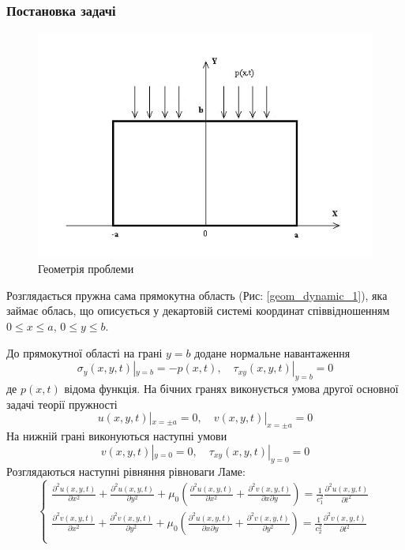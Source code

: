 \subsubsection{Постановка задачі}
\begin{figure}[h]
    \begin{center}
        \includegraphics[scale=1]{images/geometry/image_2.jpg}
    \end{center}
    \caption{Геометрія проблеми}\label{geom_dynamic_2}
\end{figure}
Розглядається пружна сама прямокутна область (Рис: \ref{geom_dynamic_1}), яка займає облась,
що описується у декартовій системі координат співвідношенням $0 \le x \le a$, $0 \le y \le b$.

До прямокутної області на грані $y=b$ додане нормальне навантаження
\begin{equation}
    \sigma_y(x, y, t) |_{y=b} = -p(x, t), \quad  \tau_{xy}(x,y,t) |_{y=b} =0
\end{equation}
де $p(x,t)$ відома функція.
На бічних гранях виконується умова другої основної задачі теорії пружності
\begin{equation}
    u(x,y,t) |_{x=\pm a} = 0, \quad v(x,y,t) |_{x=\pm a} =0
\end{equation}
На нижній грані виконуються наступні умови
\begin{equation}
    v(x,y,t) |_{y=0} = 0, \quad \tau_{xy}(x,y,t) |_{y=0} =0
\end{equation}
Розглядаються наступні рівняння рівноваги Ламе:
\begin{equation}
    \begin{cases}
        \frac{\partial^2 u(x,y,t)}{\partial x^2} + \frac{\partial^2 u(x,y,t)}{\partial y^2} + \mu_0 (\frac{\partial^2 u(x,y,t)}{\partial x^2} + \frac{\partial^2 v(x,y,t)}{\partial x\partial y}) = \frac{1}{c_1^2} \frac{\partial^2 u(x,y,t)}{\partial t^2} \\
        \frac{\partial^2 v(x,y,t)}{\partial x^2} + \frac{\partial^2 v(x,y,t)}{\partial y^2} + \mu_0 (\frac{\partial^2 u(x,y,t)}{\partial x \partial y} + \frac{\partial^2 v(x,y,t)}{\partial y^2}) = \frac{1}{c_2^2} \frac{\partial^2 v(x,y,t)}{\partial t^2} \\
    \end{cases}
\end{equation}

